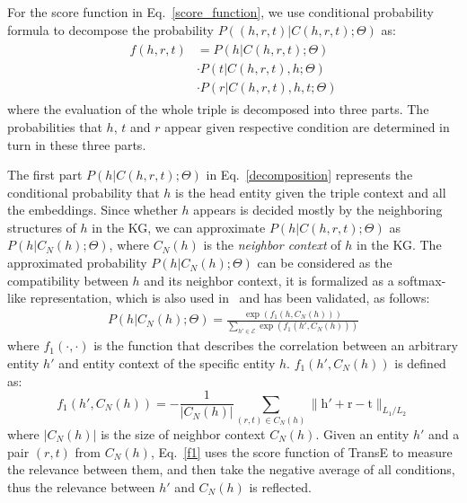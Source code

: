 For the score function in Eq.~\eqref{score_function}, we use conditional probability formula to decompose the probability $P((h,r,t)|C(h,r,t);\Theta)$ as:
\begin{align} \label{decomposition}
  \begin{split}
    f(h,r,t) &= P(h|C(h,r,t);\Theta) \\
    & \cdot P(t|C(h,r,t),h;\Theta) \\
    & \cdot P(r|C(h,r,t),h,t;\Theta)
  \end{split}
\end{align}
where the evaluation of the whole triple is decomposed into three parts. The probabilities that $h$, $t$ and $r$ appear given respective condition are determined in turn in these three parts.

The first part $P(h|C(h,r,t);\Theta)$ in Eq.~\eqref{decomposition} represents the conditional probability that $h$ is the head entity given the triple context and all the embeddings. Since whether $h$ appears is decided mostly by the neighboring structures of $h$ in the KG, we can approximate $P(h|C(h,r,t);\Theta)$ as $P(h|C_N(h);\Theta)$, where $C_N(h)$ is the \emph{neighbor context} of $h$ in the KG. The approximated probability $P(h|C_N(h);\Theta)$ can be considered as the compatibility between $h$ and its neighbor context, it is formalized as a softmax-like representation, which is also used in~\cite{DBLP:conf/emnlp/WangZFC14} and has been validated, as follows:
\begin{align} \label{P_h}
  P(h|C_N(h);\Theta) = \frac{\exp(f_1(h, C_N(h)))}{\sum_{h' \in \mathcal{E}} \exp(f_1(h', C_N(h)))}
\end{align}
where $f_1(\cdot, \cdot)$ is the function that describes the correlation between an arbitrary entity $h'$ and entity context of the specific entity $h$. $f_1(h',C_N(h))$ is defined as:
\begin{equation}\label{f1}
  f_1(h',C_N(h)) =-\frac{1}{|C_N(h)|}\sum_{(r,t)\in C_N(h)} \|\bm{\mathrm{h'}}+ \bm{\mathrm{r}} - \bm{\mathrm{t}}\|_{L_1/L_2}
\end{equation}
where $|C_N(h)|$ is the size of neighbor context $C_N(h)$. Given an entity $h'$ and a pair $(r,t)$ from $C_N(h)$, Eq.~\eqref{f1} uses the score function of TransE to measure the relevance between them, and then take the negative average of all conditions, thus the relevance between $h'$ and $C_N(h)$ is reflected.

